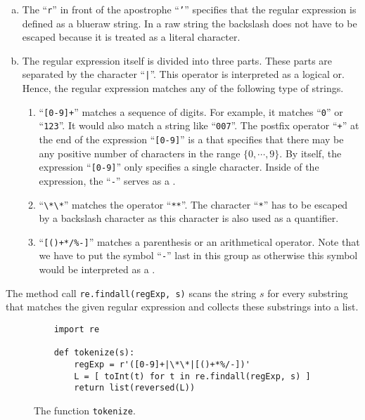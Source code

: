 \begin{enumerate}[(a)]
\item The ``\texttt{r}'' in front of the apostrophe ``\texttt{'}'' specifies that the regular expression is
      defined as a blue{raw string}.  In a raw string the backslash does not have to be
      escaped because it is treated as a literal character.
\item The regular expression itself is divided into three parts.
      These parts are separated by the character ``\texttt{|}''.  This operator is interpreted as a logical or.
      Hence, the regular expression matches any of the following type of strings.
      \begin{enumerate}
      \item ``\texttt{[0-9]+}'' matches a sequence of digits.  For example, it matches ``\texttt{0}'' or
            ``\texttt{123}''.  It would also match a string like ``\texttt{007}''.
            The postfix operator ``\texttt{+}'' at the end of the expression ``\texttt{[0-9]}'' is a
             that specifies that there may be any positive number of characters in the range
            $\{0,\cdots,9\}$.  By itself, the expression ``\texttt{[0-9]}'' only specifies a single character.
            Inside of the expression, the ``\texttt{-}'' serves as a .
      \item ``\verb|\*\*|'' matches the operator ``\texttt{**}''.  The character ``\texttt{*}'' has to be
            escaped by a backslash character as this character is also used as a quantifier.
      \item ``\texttt{[()+*/\%-]}'' matches a parenthesis or an arithmetical operator. Note that we have 
            to put the symbol ``\texttt{-}'' last in this group as otherwise this symbol would be 
            interpreted as a .
     \end{enumerate}
\end{enumerate}
The method call \texttt{re.findall(regExp, s)} scans the string $s$ for every substring that matches the
given regular expression and collects these substrings into a list.


\begin{figure}[!ht]
\centering
\begin{verbatim}
    import re

    def tokenize(s):
        regExp = r'([0-9]+|\*\*|[()+*%/-])'
        L = [ toInt(t) for t in re.findall(regExp, s) ]
        return list(reversed(L))                 
\end{verbatim}
\vspace*{-0.3cm}
\caption{The function \texttt{tokenize}.}
\label{fig:tokenize.py}
\end{figure}

